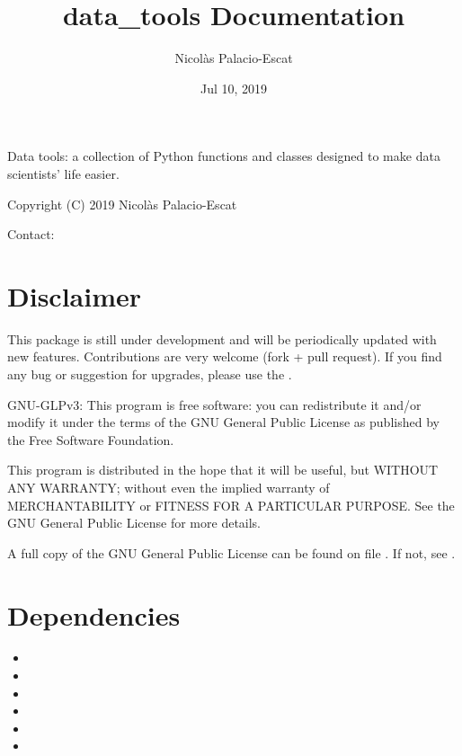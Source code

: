 \documentclass[letterpaper,10pt,english]{sphinxmanual}
\title{data\_tools Documentation}
\date{Jul 10, 2019}
\author{Nicolàs Palacio-Escat}
\begin{document}
\pagestyle{empty}
\sphinxmaketitle
\pagestyle{plain}
\sphinxtableofcontents
\pagestyle{normal}
\label{\detokenize{index::doc}}


Data tools: a collection of Python functions and classes designed to
make data scientists’ life easier.

Copyright (C) 2019 Nicolàs Palacio-Escat

Contact: 


\chapter{Disclaimer}
\label{\detokenize{index:disclaimer}}
This package is still under development and will be periodically updated
with new features. Contributions are very welcome (fork + pull request).
If you find any bug or suggestion for upgrades, please use the
.

GNU-GLPv3:
This program is free software: you can redistribute it and/or modify it
under the terms of the GNU General Public License as published by the
Free Software Foundation.

This program is distributed in the hope that it will be useful, but
WITHOUT ANY WARRANTY; without even the implied warranty of
MERCHANTABILITY or FITNESS FOR A PARTICULAR PURPOSE. See the GNU General
Public License for more details.

A full copy of the GNU General Public License can be found on file
.
If not, see .


\chapter{Dependencies}
\label{\detokenize{index:dependencies}}\begin{itemize}
\item {} 

\item {} 

\item {} 

\item {} 

\item {} 

\item {} 

\end{itemize}
\end{document}
